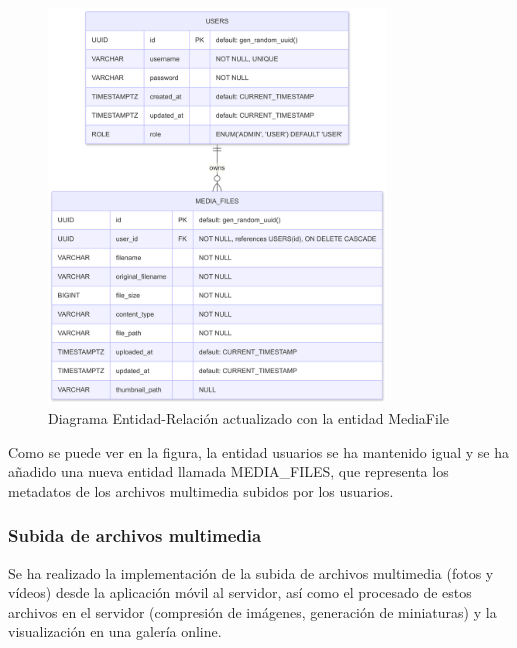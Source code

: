 \begin{figure}[H]
    \begin{center}
        \includegraphics[width=0.8\textwidth]{assets/sprint3/media-files-er-diagram.png}
    \end{center}
    \caption{Diagrama Entidad-Relación actualizado con la entidad MediaFile}\label{fig:media-files-er-diagram}
\end{figure}

Como se puede ver en la figura, la entidad usuarios se ha mantenido igual y se ha añadido una nueva entidad llamada MEDIA\_FILES, que representa los metadatos de los archivos multimedia subidos por los usuarios.


\subsubsection{Subida de archivos multimedia}

Se ha realizado la implementación de la subida de archivos multimedia (fotos y vídeos) desde la aplicación móvil al servidor, así como el procesado de estos archivos en el servidor (compresión de imágenes, generación de miniaturas) y la visualización en una galería online.

